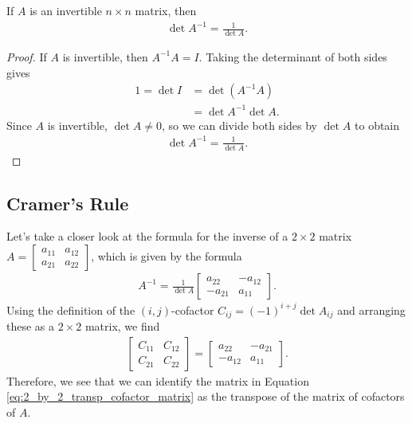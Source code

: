 \documentclass[12pt,letterpaper,reqno]{article}
\numberwithin{equation}{section}
\begin{document}
\begin{thm}
	If $A$ is an invertible $n \times n$ matrix, then
	\begin{align*}
		\det A^{-1}=\frac{1}{\det A}.
	\end{align*}
\end{thm}

\begin{proof}
	If $A$ is invertible, then $A^{-1}A=I$. Taking the determinant of both sides gives
	\begin{align*}
		1=\det I&=\det (A^{-1}A) \\
		&=\det A^{-1}\det A.
	\end{align*}
	Since $A$ is invertible, $\det A \neq 0$, so we can divide both sides by $\det A$ to obtain
	\begin{align*}
		\det A^{-1}=\frac{1}{\det A}.
	\end{align*}
\end{proof}

\subsection{Cramer's Rule}
Let's take a closer look at the formula for the inverse of a $2 \times 2$ matrix $A=\begin{bmatrix}
	a_{11} & a_{12} \\ a_{21} & a_{22}
\end{bmatrix}$, which is given by the formula
\begin{align}\label{eq:2_by_2_transp_cofactor_matrix}
	A^{-1}=\frac{1}{\det A}\begin{bmatrix}
		a_{22} & -a_{12} \\
		-a_{21} & a_{11}
	\end{bmatrix}.
\end{align}
Using the definition of the $(i,j)$-cofactor $C_{ij}=(-1)^{i+j}\det A_{ij}$ and arranging these as a $2 \times 2$ matrix, we find
\begin{align*}
	\begin{bmatrix}
		C_{11} & C_{12} \\
		C_{21} & C_{22}
	\end{bmatrix}=\begin{bmatrix}
		a_{22} & -a_{21} \\
		-a_{12} & a_{11}
	\end{bmatrix}.
\end{align*} 
Therefore, we see that we can identify the matrix in Equation \eqref{eq:2_by_2_transp_cofactor_matrix} as the transpose of the matrix of cofactors of $A$.  
\end{document}
